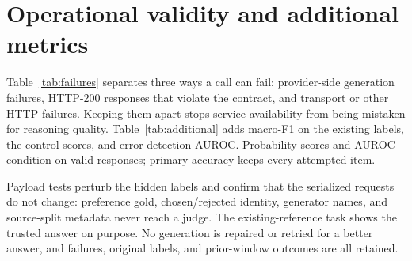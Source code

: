 \documentclass[11pt]{article}
\begin{document}
\section{Operational validity and additional metrics}
\label{app:failures}
Table~\ref{tab:failures} separates three ways a call can fail: provider-side generation failures, HTTP-200 responses that violate the contract, and transport or other HTTP failures. Keeping them apart stops service availability from being mistaken for reasoning quality. Table~\ref{tab:additional} adds macro-F1 on the existing labels, the control scores, and error-detection AUROC. Probability scores and AUROC condition on valid responses; primary accuracy keeps every attempted item.
\begin{apptable}
\centering\small
\caption{Expanded hosted base outcomes and diagnostic valid-only accuracy. Primary accuracy counts failures as wrong. All attempts and exact error types remain recorded.}
\label{tab:failures}
\end{apptable}
\begin{apptable}
\centering\small\setlength{\tabcolsep}{3pt}
\caption{Additional metrics for the fifteen configurations applicable to these tasks. AUROC treats an incorrect judgment as positive and uses $1-\max_k p_k$ as its score. Control counts include invalid outcomes; macro-F1 averages the three existing-label classes.}
\label{tab:additional}
\end{apptable}
Payload tests perturb the hidden labels and confirm that the serialized requests do not change: preference gold, chosen/rejected identity, generator names, and source-split metadata never reach a judge. The existing-reference task shows the trusted answer on purpose. No generation is repaired or retried for a better answer, and failures, original labels, and prior-window outcomes are all retained.
\FloatBarrier
\end{document}

